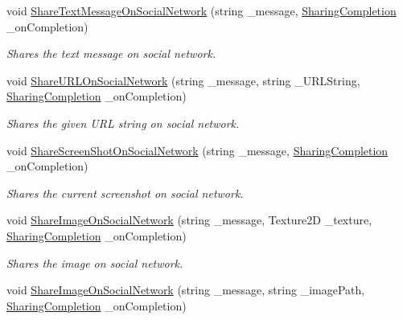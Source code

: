 \begin{DoxyCompactItemize}
\item 
void \hyperlink{class_voxel_busters_1_1_native_plugins_1_1_sharing_a80ecaed1c891f9531a50bfad127a8a64}{Share\+Text\+Message\+On\+Social\+Network} (string \+\_\+message, \hyperlink{class_voxel_busters_1_1_native_plugins_1_1_sharing_a61017c6d51721d2ca6154ffef15a6555}{Sharing\+Completion} \+\_\+on\+Completion)
\begin{DoxyCompactList}\small\item\em Shares the text message on social network. \end{DoxyCompactList}\item 
void \hyperlink{class_voxel_busters_1_1_native_plugins_1_1_sharing_ac6302fd4f28ed86d64a59981e60649ee}{Share\+U\+R\+L\+On\+Social\+Network} (string \+\_\+message, string \+\_\+\+U\+R\+L\+String, \hyperlink{class_voxel_busters_1_1_native_plugins_1_1_sharing_a61017c6d51721d2ca6154ffef15a6555}{Sharing\+Completion} \+\_\+on\+Completion)
\begin{DoxyCompactList}\small\item\em Shares the given U\+R\+L string on social network. \end{DoxyCompactList}\item 
void \hyperlink{class_voxel_busters_1_1_native_plugins_1_1_sharing_a39af8f3cc39f56532ebff16fb8ca280a}{Share\+Screen\+Shot\+On\+Social\+Network} (string \+\_\+message, \hyperlink{class_voxel_busters_1_1_native_plugins_1_1_sharing_a61017c6d51721d2ca6154ffef15a6555}{Sharing\+Completion} \+\_\+on\+Completion)
\begin{DoxyCompactList}\small\item\em Shares the current screenshot on social network. \end{DoxyCompactList}\item 
void \hyperlink{class_voxel_busters_1_1_native_plugins_1_1_sharing_a35821886e7759f0685e000010dbb9708}{Share\+Image\+On\+Social\+Network} (string \+\_\+message, Texture2\+D \+\_\+texture, \hyperlink{class_voxel_busters_1_1_native_plugins_1_1_sharing_a61017c6d51721d2ca6154ffef15a6555}{Sharing\+Completion} \+\_\+on\+Completion)
\begin{DoxyCompactList}\small\item\em Shares the image on social network. \end{DoxyCompactList}\item 
void \hyperlink{class_voxel_busters_1_1_native_plugins_1_1_sharing_ae801ac65a3179cc1e27814e6b4529d26}{Share\+Image\+On\+Social\+Network} (string \+\_\+message, string \+\_\+image\+Path, \hyperlink{class_voxel_busters_1_1_native_plugins_1_1_sharing_a61017c6d51721d2ca6154ffef15a6555}{Sharing\+Completion} \+\_\+on\+Completion)

\end{DoxyCompactItemize}

